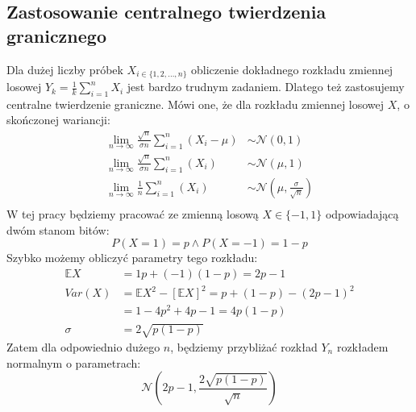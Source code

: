 \subsection{Zastosowanie centralnego twierdzenia granicznego}
Dla dużej liczby próbek $X_{i \in \{1, 2, \dots, n\}}$ obliczenie dokładnego rozkładu zmiennej losowej $Y_k = \frac{1}{k}\sum_{i = 1}^{n}X_i$ jest bardzo trudnym zadaniem. Dlatego też zastosujemy centralne twierdzenie graniczne. Mówi one, że dla rozkładu zmiennej losowej $X$, o skończonej wariancji:
\begin{equation}
\begin{split}
\lim_{n \to \infty}\frac{\sqrt{n}}{\sigma n }\sum_{i = 1}^{n}(X_i-\mu) &\sim \mathcal{N}(0, 1)\\
\lim_{n \to \infty}\frac{\sqrt{n}}{\sigma n}\sum_{i = 1}^{n}(X_i) &\sim \mathcal{N}(\mu, 1)\\
\lim_{n \to \infty}\frac{1}{n}\sum_{i = 1}^{n}(X_i) &\sim \mathcal{N}\left(\mu, \frac{\sigma}{\sqrt{n}}\right)\\
\end{split}
\end{equation}
W tej pracy będziemy pracować ze zmienną losową $X \in \{-1, 1\}$ odpowiadającą dwóm stanom bitów:
\begin{equation}
    P(X = 1) = p \land P(X = -1) = 1 - p \label{eq:dist}
\end{equation}
Szybko możemy obliczyć parametry tego rozkładu:
\begin{equation}
\begin{split}
\mathbb{E}X &= 1p+(-1)(1-p) = 2p - 1\\
Var(X) &= \mathbb{E}X^2 - [\mathbb{E}X]^2 = p + (1-p) - (2p-1)^2 \\
&= 1 - 4p^2 + 4p -1 = 4p(1-p)\\
\sigma &= 2\sqrt{p(1-p)}
\end{split}
\end{equation}
Zatem dla odpowiednio dużego $n$, będziemy przybliżać rozkład $Y_n$ rozkładem normalnym o parametrach:
\begin{equation}
    \label{eq:norm_dist_avg}
    \mathcal{N}\left(2p - 1, \frac{2\sqrt{p(1-p)}}{\sqrt{n}}\right)
\end{equation}

